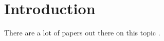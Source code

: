 \section{Introduction}

There are a lot of papers out there on this topic \cite{ASE08,DBLP:conf/icst/Arcuri10a,DBLP:conf/icst/FraserA11,DBLP:journals/tse/Arcuri12,DBLP:journals/stvr/FraserA13}. 
